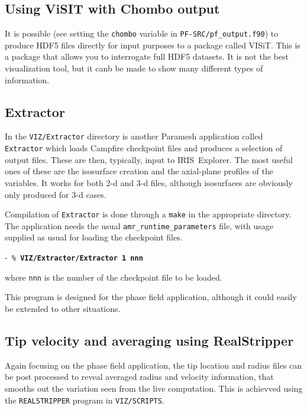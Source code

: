 \documentclass[paper=a4, fontsize=11pt,twoside,bibtotoc]{scrartcl}		%
\newenvironment{codebox}{\begin{center}\begin{MakeFramed}{\hsize0.99\linewidth\advance\hsize-\width\FrameRestore}\tt}{\end{MakeFramed}\end{center}}
\newcommand{\prompt}[1]{\textsl{\%} \textbf{#1}}
\begin{document}
\subsection{Using ViSIT with Chombo output}

It is possible (see setting the \texttt{chombo} variable in \texttt{PF-SRC/pf\_output.f90}) to produce HDF5 files directly for input purposes to a package called 
VISiT.  This is a package that allows you to interrogate full HDF5 datasets.  It is not the best visualization tool, but it canb be made to show many different 
types of information.

\subsection{Extractor}

In the \texttt{VIZ/Extractor} directory is another Paramesh application called \texttt{Extractor} which loads Campfire checkpoint files and produces a selection 
of output files.  These are then, typically, input to IRIS~Explorer.  The most useful ones of these are the isosurface creation and the axial-plane profiles of 
the variables.  It works for both 2-d and 3-d files, although isosurfaces are obviously only produced for 3-d cases.

Compilation of \texttt{Extractor} is done through a \texttt{make} in the appropriate directory.  The application needs the usual 
\texttt{amr\_runtime\_parameters} file, with usage supplied as usual for loading the checkpoint files.
\begin{codebox}
        \prompt{VIZ/Extractor/Extractor 1 nnn}
\end{codebox}
where \texttt{nnn} is the number of the checkpoint file to be loaded.

This program is designed for the phase field application, although it could easily be extended to other situations.



\subsection{Tip velocity and averaging using RealStripper}

Again focusing on the phase field application, the tip location and radius files can be post processed to reveal averaged radius and velocity information, that 
smooths out the variation seen from the live computation.  This is achievved using the \texttt{REALSTRIPPER} program in \texttt{VIZ/SCRIPTS}.
\end{document}
